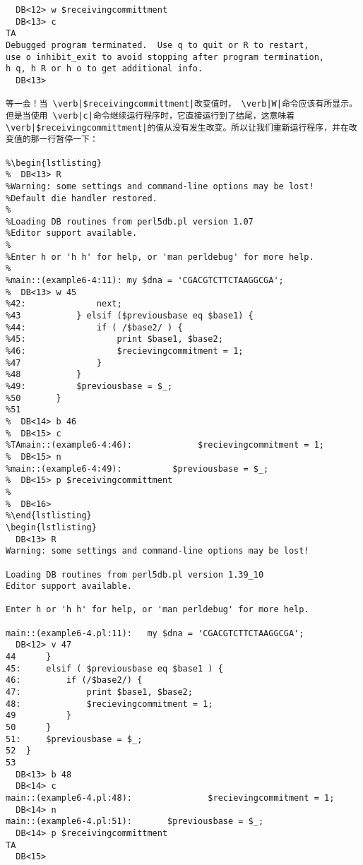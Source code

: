 \begin{lstlisting}
  DB<12> w $receivingcommittment
  DB<13> c
TA
Debugged program terminated.  Use q to quit or R to restart,
use o inhibit_exit to avoid stopping after program termination,
h q, h R or h o to get additional info.
  DB<13> 

等一会！当 \verb|$receivingcommittment|改变值时， \verb|W|命令应该有所显示。但是当使用 \verb|c|命令继续运行程序时，它直接运行到了结尾，这意味着 \verb|$receivingcommittment|的值从没有发生改变。所以让我们重新运行程序，并在改变值的那一行暂停一下：

%\begin{lstlisting}
%  DB<13> R
%Warning: some settings and command-line options may be lost!
%Default die handler restored.
%
%Loading DB routines from perl5db.pl version 1.07
%Editor support available.
%
%Enter h or 'h h' for help, or 'man perldebug' for more help.
%
%main::(example6-4:11):	my $dna = 'CGACGTCTTCTAAGGCGA';
%  DB<13> w 45
%42:              next;
%43           } elsif ($previousbase eq $base1) {
%44:              if ( /$base2/ ) {
%45:                  print $base1, $base2; 
%46:                  $recievingcommitment = 1;
%47               }
%48           }
%49:          $previousbase = $_;
%50       }
%51
%  DB<14> b 46
%  DB<15> c
%TAmain::(example6-4:46):             $recievingcommitment = 1;
%  DB<15> n
%main::(example6-4:49):          $previousbase = $_;
%  DB<15> p $receivingcommittment
%
%  DB<16> 
%\end{lstlisting}
\begin{lstlisting}
  DB<13> R
Warning: some settings and command-line options may be lost!

Loading DB routines from perl5db.pl version 1.39_10
Editor support available.

Enter h or 'h h' for help, or 'man perldebug' for more help.

main::(example6-4.pl:11):	my $dna = 'CGACGTCTTCTAAGGCGA';
  DB<12> v 47
44 	    }
45:	    elsif ( $previousbase eq $base1 ) {
46:	        if (/$base2/) {
47:	            print $base1, $base2;
48:	            $recievingcommitment = 1;
49 	        }
50 	    }
51:	    $previousbase = $_;
52 	}
53 	
  DB<13> b 48
  DB<14> c
main::(example6-4.pl:48):	            $recievingcommitment = 1;
  DB<14> n
main::(example6-4.pl:51):	    $previousbase = $_;
  DB<14> p $receivingcommittment
TA
  DB<15> 
\end{lstlisting}

